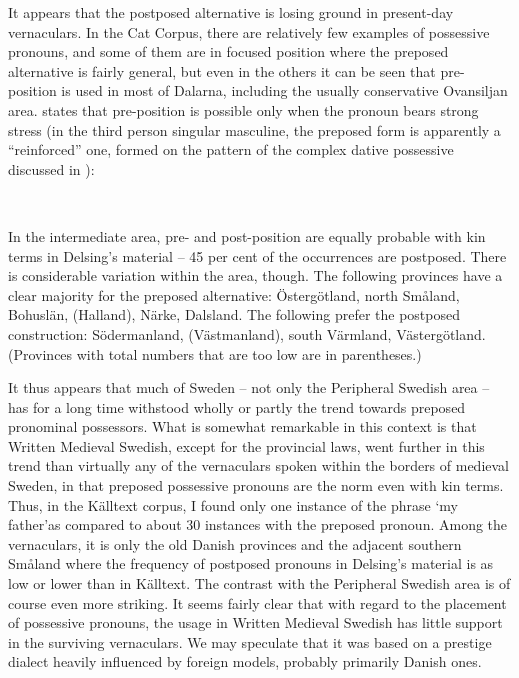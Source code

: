 It appears that the postposed alternative is losing ground in present-day vernaculars. In the Cat Corpus, there are relatively few examples of possessive pronouns, and some of them are in focused position where the preposed alternative is fairly general, but even in the others it can be seen that pre-position is used in most of Dalarna, including the usually conservative Ovansiljan area. \citet[111]{Levander1909} states that pre-position is possible only when the pronoun bears strong stress (in the third person singular masculine, the preposed form is apparently a “reinforced” one, formed on the pattern of the complex dative possessive discussed in ):

\ea
{}\\
\z
\z

In the intermediate area, pre- and post-position are equally probable with kin terms in Delsing’s material – 45 per cent of the occurrences are postposed. There is considerable variation within the area, though. The following provinces have a clear majority for the preposed alternative: Östergötland, north Småland, Bohuslän, (Halland), Närke, Dalsland. The following prefer the postposed construction: Södermanland, (Västmanland), south Värmland, Västergötland. (Provinces with total numbers that are too low are in parentheses.)

It thus appears that much of Sweden – not only the Peripheral Swedish area – has for a long time withstood wholly or partly the trend towards preposed pronominal possessors. What is somewhat remarkable in this context is that Written Medieval Swedish, except for the provincial laws, went further in this trend than virtually any of the vernaculars spoken within the borders of medieval Sweden, in that preposed possessive pronouns are the norm even with kin terms. Thus, in the Källtext corpus, I found only one instance of the phrase ‘my father’\textstyleLinguisticExample{ }as compared to about 30 instances with the preposed pronoun. Among the vernaculars, it is only the old Danish provinces and the adjacent southern Småland where the frequency of postposed pronouns in Delsing’s material is as low or lower than in Källtext. The contrast with the Peripheral Swedish area is of course even more striking. It seems fairly clear that with regard to the placement of possessive pronouns, the usage in Written Medieval Swedish has little support in the surviving vernaculars. We may speculate that it was based on a prestige dialect heavily influenced by foreign models, probably primarily Danish ones.

